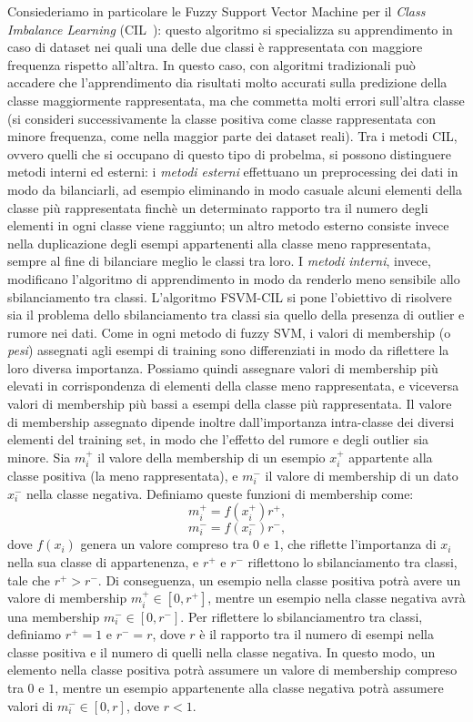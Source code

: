 \documentclass[oneside, openany]{book}
\begin{document}
	Consiederiamo in particolare le Fuzzy Support Vector Machine per il \textit{Class Imbalance Learning} (CIL~\cite{bib:cil}): questo algoritmo si specializza su apprendimento in caso di dataset nei quali una delle due classi è rappresentata con maggiore frequenza rispetto all'altra. In questo caso, con algoritmi tradizionali può accadere che l'apprendimento dia risultati molto accurati sulla predizione della classe maggiormente rappresentata, ma che commetta molti errori sull'altra classe (si consideri successivamente la classe positiva come classe rappresentata con minore frequenza, come nella maggior parte dei dataset reali).\newline
	Tra i metodi CIL, ovvero quelli che si occupano di questo tipo di probelma, si possono distinguere metodi interni ed esterni: i \textit{metodi esterni} effettuano un preprocessing dei dati in modo da bilanciarli, ad esempio eliminando in modo casuale alcuni elementi della classe più rappresentata finchè un determinato rapporto tra il numero degli elementi in ogni classe viene raggiunto; un altro metodo esterno consiste invece nella duplicazione degli esempi appartenenti alla classe meno rappresentata, sempre al fine di bilanciare meglio le classi tra loro. I \textit{metodi interni}, invece, modificano l'algoritmo di apprendimento in modo da renderlo meno sensibile allo sbilanciamento tra classi.\newline 
	L'algoritmo FSVM-CIL si pone l'obiettivo di risolvere sia il problema dello sbilanciamento tra classi sia quello della presenza di outlier e rumore nei dati. Come in ogni metodo di fuzzy SVM, i valori di membership (o \textit{pesi}) assegnati agli esempi di training sono differenziati in modo da riflettere la loro diversa importanza. Possiamo quindi assegnare valori di membership più elevati in corrispondenza di elementi della classe meno rappresentata, e viceversa valori di membership più bassi a esempi della classe più rappresentata. Il valore di membership assegnato dipende inoltre dall'importanza intra-classe dei diversi elementi del training set, in modo che l'effetto del rumore e degli outlier sia minore.\newline
	Sia $m_i^+$ il valore della membership di un esempio $x_i^+$ appartente alla classe positiva (la meno rappresentata), e $m_i^-$ il valore di membership di un dato $x_i^-$ nella classe negativa. Definiamo queste funzioni di membership come:
		\[
			m_i^+ = f(x_i^+)r^+\text{,}
		\]
		\[	
			m_i^- = f(x_i^-)r^-\text{,}
		\]
	dove $f(x_i)$ genera un valore compreso tra $0$ e $1$, che riflette l'importanza di $x_i$ nella sua classe di appartenenza, e $r^+$ e $r^-$ riflettono lo sbilanciamento tra classi, tale che $r^+>r^-$.	Di conseguenza, un esempio nella classe positiva potrà avere un valore di membership $m_i^+ \in [0,r^+]$, mentre un esempio nella classe negativa avrà una membership $m_i^- \in [0,r^-]$. Per riflettere lo sbilanciamentro tra classi, definiamo $r^+=1$ e $r^-=r$, dove $r$ è il rapporto tra il numero di esempi nella classe positiva e il numero di quelli nella classe negativa. In questo modo, un elemento nella classe positiva potrà assumere un valore di membership compreso tra $0$ e $1$, mentre un esempio appartenente alla classe negativa potrà assumere valori di $m_i^- \in [0,r]$, dove $r<1$.
\end{document}
